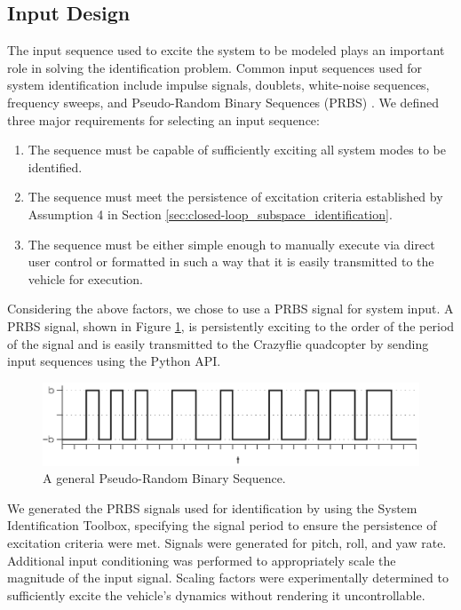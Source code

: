 \subsection{Input Design}
The input sequence used to excite the system to be modeled plays an important role in solving the identification problem. Common input sequences used for system identification include impulse signals, doublets, white-noise sequences, frequency sweeps, and Pseudo-Random Binary Sequences (PRBS) \cite{verhaegen2007filtering}. We defined three major requirements for selecting an input sequence:
\begin{enumerate}
\item The sequence must be capable of sufficiently exciting all system modes to be identified.
\item The sequence must meet the persistence of excitation criteria established by Assumption 4 in Section \ref{sec:closed-loop_subspace_identification}.
\item The sequence must be either simple enough to manually execute via direct user control or formatted in such a way that it is easily transmitted to the vehicle for execution.  
\end{enumerate}
Considering the above factors, we chose to use a PRBS signal for system input. A PRBS signal, shown in Figure \ref{fig:general_prbs}, is persistently exciting to the order of the period of the signal \cite{wilson2005understanding} and is easily transmitted to the Crazyflie quadcopter by sending input sequences using the Python API\@.
\begin{figure}[htb!]
	\centering
	\includegraphics{../fig/general_prbs.eps}
	\caption{A general Pseudo-Random Binary Sequence.}
	\label{fig:general_prbs}
\end{figure}

We generated the PRBS signals used for identification by using the \matlab System Identification Toolbox, specifying the signal period to ensure the persistence of excitation criteria were met. Signals were generated for pitch, roll, and yaw rate. Additional input conditioning was performed to appropriately scale the magnitude of the input signal. Scaling factors were experimentally determined to sufficiently excite the vehicle's dynamics without rendering it uncontrollable.

